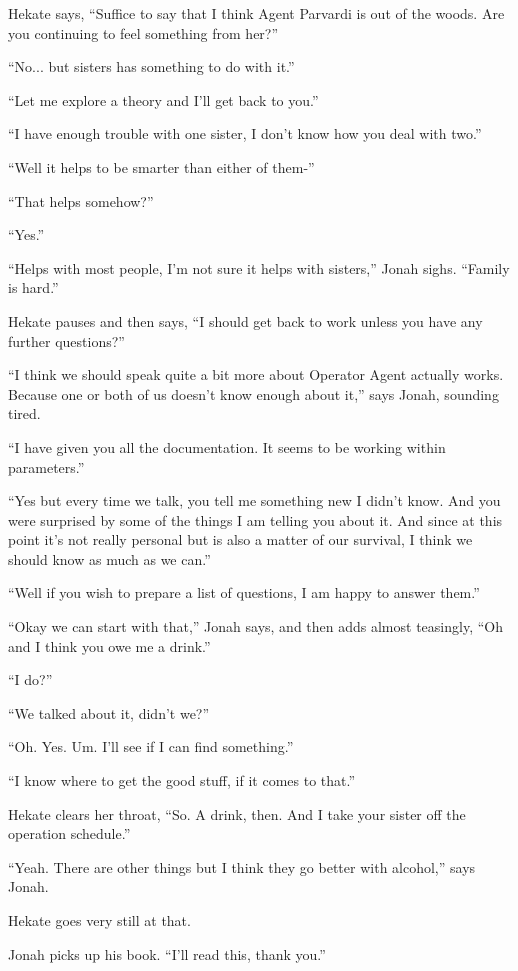 Hekate says, ``Suffice to say that I think Agent Parvardi is out of the woods.  Are you continuing to feel something from her?''

``No... but sisters has something to do with it.''

``Let me explore a theory and I'll get back to you.''

``I have enough trouble with one sister, I don't know how you deal with two.''

``Well it helps to be smarter than either of them-''

``That helps somehow?''

``Yes.''

``Helps with most people, I'm not sure it helps with sisters,'' Jonah sighs.  ``Family is hard.''

Hekate pauses and then says, ``I should get back to work unless you have any further questions?''

``I think we should speak quite a bit more about Operator Agent actually works.  Because one or both of us doesn't know enough about it,'' says Jonah, sounding tired. 

``I have given you all the documentation.  It seems to be working within parameters.''

``Yes but every time we talk, you tell me something new I didn't know.  And you were surprised by some of the things I am telling you about it.  And since at this point it's not really personal but is also a matter of our survival, I think we should know as much as we can.''

``Well if you wish to prepare a list of questions, I am happy to answer them.''

``Okay we can start with that,'' Jonah says, and then adds almost teasingly, ``Oh and I think you owe me a drink.''

``I do?''

``We talked about it, didn't we?''

``Oh.  Yes.  Um.  I'll see if I can find something.''

``I know where to get the good stuff, if it comes to that.''

Hekate clears her throat, ``So.  A drink, then.  And I take your sister off the operation schedule.'' 

``Yeah.  There are other things but I think they go better with alcohol,'' says Jonah.

Hekate goes very still at that.  

Jonah picks up his book. ``I'll read this, thank you.''

